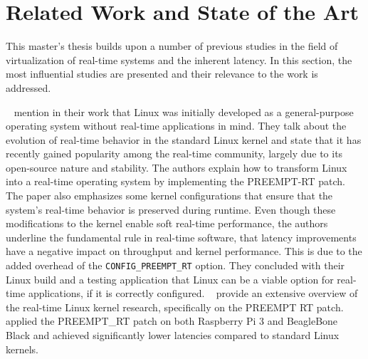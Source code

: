 \documentclass[MMR,Master,english]{style/twbook}
\begin{document}
\section{Related Work and State of the Art}
This master's thesis builds upon a number of previous studies in the field of virtualization of real-time systems and the inherent latency. In this section, the most influential studies are presented and their relevance to the work is addressed.

\bigskip \noindent \citeauthor{perneelRealtimeCapabilitiesStandard2015}~\cite{perneelRealtimeCapabilitiesStandard2015} mention in their work that Linux was initially developed as a general-purpose operating system without real-time applications in mind. They talk about the evolution of real-time behavior in the standard Linux kernel and state that it has recently gained popularity among the real-time community, largely due to its open-source nature and stability. The authors explain how to transform Linux into a real-time operating system by implementing the PREEMPT-RT patch. The paper also emphasizes some kernel configurations that ensure that the system's real-time behavior is preserved during runtime. Even though these modifications to the kernel enable soft real-time performance, the authors underline the fundamental rule in real-time software, that latency improvements have a negative impact on throughput and kernel performance. This is due to the added overhead of the \texttt{CONFIG\_PREEMPT\_RT} option. They concluded with their Linux build and a testing application that Linux can be a viable option for real-time applications, if it is correctly configured. \citeauthor{reghenzaniRealTimeLinuxKernel2020}~\cite{reghenzaniRealTimeLinuxKernel2020} provide an extensive overview of the real-time Linux kernel research, specifically on the PREEMPT RT patch. \citeauthor{adamRealTimePerformanceResponse2021}~\cite{adamRealTimePerformanceResponse2021} applied the PREEMPT\_RT patch on both Raspberry Pi 3 and BeagleBone Black and achieved significantly lower latencies compared to standard Linux kernels.
\end{document}
